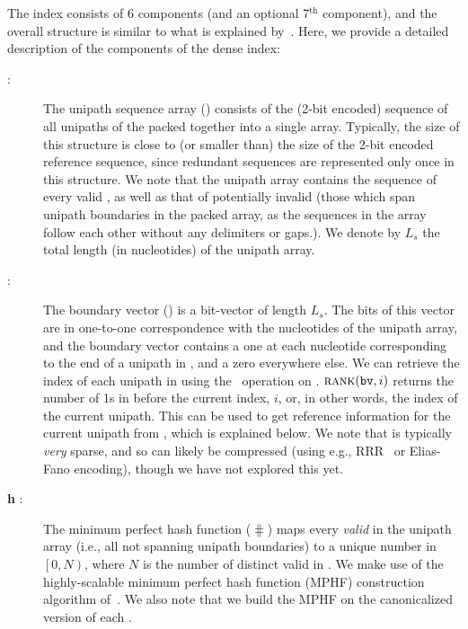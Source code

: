   The index consists of 6
  components (and an optional 7$^\text{th}$ component), and the overall structure
  is similar to what is explained by~\citet{liu2016debga}.
  Here, we provide a detailed description of the components of the dense
  \pufferfish index:

  \begin{description}

    \item[\cseq :] The unipath sequence array (\cseq) consists of the (2-bit encoded) sequence
    of all unipaths of the \ccdbg packed together into a single array. Typically,
    the size of this structure is close to (or smaller than) the size of the 2-bit
    encoded reference sequence, since redundant sequences are represented only
    once in this structure. We note that the unipath array contains the sequence of
    every valid \kmer, as well as that of potentially invalid \kmers (those which
    span unipath boundaries in the packed array, as the sequences in the
    array follow each other without any delimiters or gaps.). We denote by $L_s$
    the total length (in nucleotides) of the unipath array.

    \item[\bv :] The boundary vector (\bv) is a bit-vector of length $L_s$. The bits of
    this vector are in one-to-one correspondence with the nucleotides of the
    unipath array, and the boundary vector contains a one at each nucleotide
    corresponding to the end of a unipath in \cseq, and a zero everywhere else. We
    can retrieve the index of each unipath in \cseq using the \rank~operation on
    \bv. $\mbox{\sc rank}(\texttt{bv},i)$ returns the number of 1s in \bv before the current index,
    $i$, or, in other words, the index of the current unipath. This can be used to
    get reference information for the current unipath from \ctab, which is explained below.
    We note that \bv is typically \emph{very} sparse, and so can likely be compressed (using e.g., RRR~\citep{RamanRaRa02} or Elias-Fano
    encoding), though we have not explored this yet.

    \item[\textbf{h} :] The minimum perfect hash function ($\hash$) maps every
    \emph{valid} \kmer in the unipath array (i.e., all \kmers not spanning unipath
    boundaries) to a unique number in $\left[0,N\right)$, where $N$ is the number
    of distinct valid \kmers in \cseq. We make use of the highly-scalable
    minimum perfect hash function (MPHF)
    construction algorithm of~\citet{limasset2017fast}.  We also note that we build the
    MPHF on the canonicalized version of each \kmer.


\end{description}
